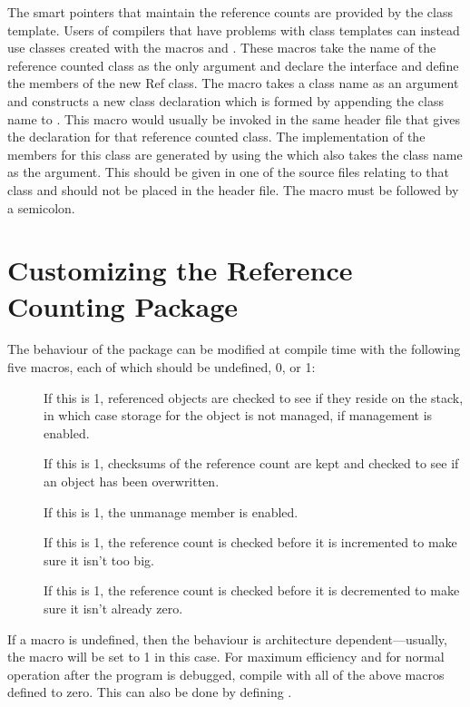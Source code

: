 The smart pointers that maintain the reference counts are
provided by the  class template.  Users of
compilers that have problems with class templates can instead
use classes created with the  macros  and
.  These macros take the name of the reference counted
class as the only argument and declare the interface
and define the members of the new Ref class.
The  macro takes a class name as an argument and
constructs a new class declaration which is formed by appending the
class name to .  This macro would usually be invoked in the
same header file that gives the declaration for that reference counted
class.  The implementation of the members for this class are generated
by using the  which also takes the class name as the
argument.  This should be given in one of the source files relating to
that class and should not be placed in the header file.  The
 macro must be followed by a semicolon.

\section{Customizing the Reference Counting Package}

  The behaviour of the package can be modified at compile time
with the following five macros, each of which should be undefined, 0, or 1:

\begin{description}
\item[]
  If this is 1, referenced objects are checked to see if they
  reside on the stack, in which case storage for the object is not managed,
  if management is enabled.
\item[]
  If this is 1, checksums of the reference count are kept
  and checked to see if an object has been overwritten.
\item[]
  If this is 1, the unmanage member is enabled.
\item[]
  If this is 1, the reference count is checked before
  it is incremented to make sure it isn't too big.
\item[]
  If this is 1, the reference count is checked before
  it is decremented to make sure it isn't already zero.
\end{description}

If a macro is undefined, then the behaviour is architecture
dependent---usually, the macro will be set to 1 in this case.
For maximum efficiency and for normal operation after the program is
debugged, compile with all of the above macros defined to zero.
This can also be done by defining .

